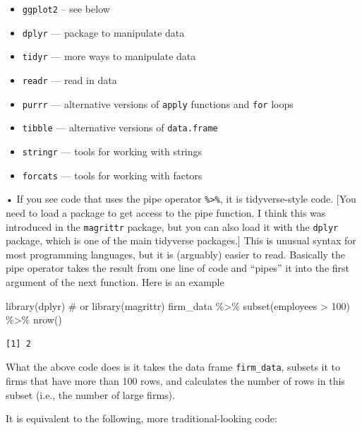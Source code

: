\documentclass[
  letterpaper,
  DIV=11,
  numbers=noendperiod]{scrreprt}
\newenvironment{Shaded}{\begin{snugshade}}{\end{snugshade}}
\newcommand{\CommentTok}[1]{\textcolor[rgb]{0.37,0.37,0.37}{#1}}
\newcommand{\DecValTok}[1]{\textcolor[rgb]{0.68,0.00,0.00}{#1}}
\newcommand{\FunctionTok}[1]{\textcolor[rgb]{0.28,0.35,0.67}{#1}}
\newcommand{\NormalTok}[1]{\textcolor[rgb]{0.00,0.23,0.31}{#1}}
\newcommand{\SpecialCharTok}[1]{\textcolor[rgb]{0.37,0.37,0.37}{#1}}
\begin{document}
\begin{itemize}
\item
  \texttt{ggplot2} -- see below
\item
  \texttt{dplyr} --- package to manipulate data
\item
  \texttt{tidyr} --- more ways to manipulate data
\item
  \texttt{readr} --- read in data
\item
  \texttt{purrr} --- alternative versions of \texttt{apply} functions
  and \texttt{for} loops
\item
  \texttt{tibble} --- alternative versions of \texttt{data.frame}
\item
  \texttt{stringr} --- tools for working with strings
\item
  \texttt{forcats} --- tools for working with factors
\end{itemize}

• If you see code that uses the pipe operator
\texttt{\%\textgreater{}\%}, it is tidyverse-style code. {[}You need to
load a package to get access to the pipe function. I think this was
introduced in the \texttt{magrittr} package, but you can also load it
with the \texttt{dplyr} package, which is one of the main tidyverse
packages.{]} This is unusual syntax for most programming languages, but
it is (arguably) easier to read. Basically the pipe operator takes the
result from one line of code and ``pipes'' it into the first argument of
the next function. Here is an example

\begin{Shaded}
\begin{Highlighting}[]
\FunctionTok{library}\NormalTok{(dplyr) }\CommentTok{\# or library(magrittr)}
\NormalTok{firm\_data }\SpecialCharTok{\%\textgreater{}\%}
  \FunctionTok{subset}\NormalTok{(employees }\SpecialCharTok{\textgreater{}} \DecValTok{100}\NormalTok{) }\SpecialCharTok{\%\textgreater{}\%}
  \FunctionTok{nrow}\NormalTok{()}
\end{Highlighting}
\end{Shaded}

\begin{verbatim}
[1] 2
\end{verbatim}

What the above code does is it takes the data frame \texttt{firm\_data},
subsets it to firms that have more than 100 rows, and calculates the
number of rows in this subset (i.e., the number of large firms).

It is equivalent to the following, more traditional-looking code:
\end{document}
